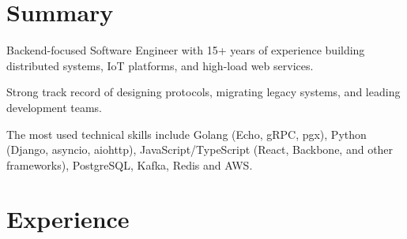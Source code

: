 \documentclass[11pt,a4paper,sans]{moderncv}
\begin{document}
\makecvtitle

\section{Summary}

Backend-focused Software Engineer with 15+ years of experience building distributed systems,
IoT platforms, and high-load web services.

\medskip

Strong track record of designing protocols, migrating legacy systems, and leading development teams.

\medskip

The most used technical skills include Golang (Echo, gRPC, pgx), Python (Django, asyncio, aiohttp),
JavaScript/TypeScript (React, Backbone, and other frameworks), PostgreSQL, Kafka, Redis and AWS.

\section{Experience}
\end{document}
